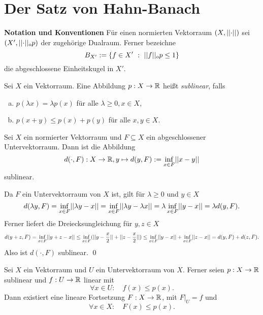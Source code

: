 \section{Der Satz von Hahn-Banach}
\textbf{Notation und Konventionen}\newline
Für einen normierten Vektorraum $(X, \lvert\lvert \cdot \rvert\rvert)$ sei $(X', \lvert\lvert \cdot \rvert\rvert_op)$ der zugehörige Dualraum. Ferner bezeichne
$$
    B_{X'} := \{f \in X' \ : \ \lvert\lvert f \rvert\rvert_op \leq 1 \}
$$
die abgeschlossene Einheitskugel in $X'$. 

\begin{mydef}
    Sei $X$ ein Vektorraum. Eine Abbildung $p:X \to \mathbb{R}$ heißt \textit{sublinear}, falls
    \begin{enumerate}[(a)]
        \item $p(\lambda x) = \lambda p(x)$ für alle $\lambda \geq 0, x \in X$,
        \item $p(x+y) \leq p(x) + p(y)$ für alle $x,y \in X$. 
    \end{enumerate}
\end{mydef}

\begin{proposition}
    Sei $X$ ein normierter Vektorraum und $F \subseteq X$ ein abgeschlossener Untervektorraum. Dann ist die Abbildung
    $$
        d(\cdot, F):X \to \mathbb{R}, y \mapsto d(y,F) := \inf_{x \in F}\lvert\lvert x-y \rvert\rvert
    $$
    sublinear. 
\end{proposition}

\begin{proof*}
    Da $F$ ein Untervektorraum von $X$ ist, gilt für $\lambda \geq 0$ und $y \in X$ 
    $$
        d(\lambda y, F) = \inf_{x \in F}\lvert\lvert \lambda y - x \rvert\rvert = \inf_{x \in F}\lvert\lvert \lambda y - \lambda x \rvert\rvert = \lambda \inf_{x \in F}\lvert\lvert y-x \rvert\rvert = \lambda d(y,F). 
    $$
    Ferner liefert die Dreiecksungleichung für $y,z \in X$
    $$
        d(y+z,F) = \inf_{x \in F}\lvert\lvert y+z - x \rvert\rvert \leq \inf_{x \in F}(\lvert\lvert y - \frac{x}{2} \rvert\rvert + \lvert\lvert z - \frac{x}{2} \rvert\rvert) \leq \inf_{x \in F}\lvert\lvert y-x \rvert\rvert + \inf_{x \in F}\lvert\lvert z-x \rvert\rvert = d(y,F) + d(z,F). 
    $$
    Also ist $d(\cdot, F)$ sublinear. \qed 
\end{proof*}

\begin{theorem}
    Sei $X$ ein Vektorraum und $U$ ein Untervektorraum von $X$. Ferner seien $p: X \to \mathbb{R}$ sublinear und $f: U \to \mathbb{R}$ linear mit 
    $$
       \forall x \in U: \quad f(x) \leq p(x).
    $$
    Dann existiert eine lineare Fortsetzung $F:X \to \mathbb{R}$, mit $F|_U = f$ und
    $$
    \forall x \in X: \quad F(x) \leq p(x). 
    $$ 
\end{theorem}

